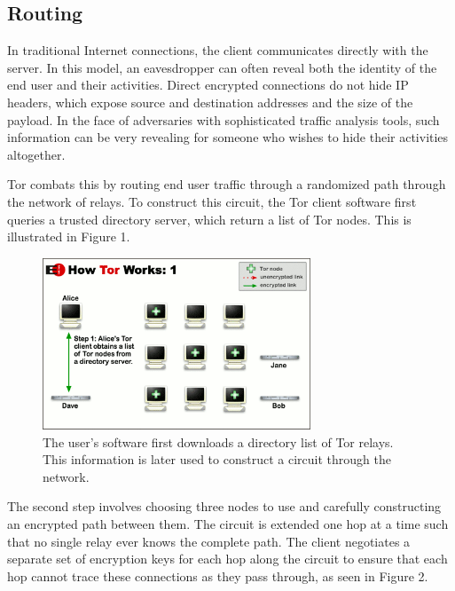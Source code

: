 \documentclass[journal]{IEEEtran}
\begin{document}
\subsection{Routing}

In traditional Internet connections, the client communicates directly with the server. In this model, an eavesdropper can often reveal both the identity of the end user and their activities. Direct encrypted connections do not hide IP headers, which expose source and destination addresses and the size of the payload. In the face of adversaries with sophisticated traffic analysis tools, such information can be very revealing for someone who wishes to hide their activities altogether.

Tor combats this by routing end user traffic through a randomized path through the network of relays. To construct this circuit, the Tor client software first queries a trusted directory server, which return a list of Tor nodes. This is illustrated in Figure 1.

\begin{figure}[htbp]
\centering
\begin{minipage}{8 cm}
    \includegraphics[width=80mm]{resources/circuit-building-1.png}
    \caption{The user's software first downloads a directory list of Tor relays. This information is later used to construct a circuit through the network.\cite{McCoy2008}}
\end{minipage}
\end{figure}

The second step involves choosing three nodes to use and carefully constructing an encrypted path between them. The circuit is extended one hop at a time such that no single relay ever knows the complete path. The client negotiates a separate set of encryption keys for each hop along the circuit to ensure that each hop cannot trace these connections as they pass through, as seen in Figure 2.
\end{document}
